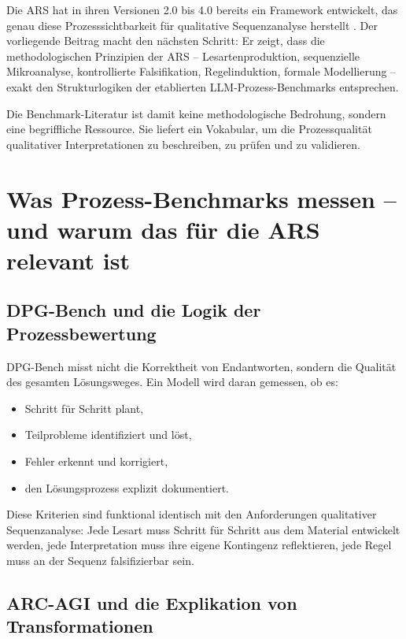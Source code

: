 \documentclass[12pt,a4paper]{article}
\begin{document}
Die ARS hat in ihren Versionen 2.0 bis 4.0 bereits ein Framework entwickelt, das genau diese Prozesssichtbarkeit für qualitative Sequenzanalyse herstellt \cite{koop2024ars}. Der vorliegende Beitrag macht den nächsten Schritt: Er zeigt, dass die methodologischen Prinzipien der ARS – Lesartenproduktion, sequenzielle Mikroanalyse, kontrollierte Falsifikation, Regelinduktion, formale Modellierung – exakt den Strukturlogiken der etablierten LLM-Prozess-Benchmarks entsprechen.

Die Benchmark-Literatur ist damit keine methodologische Bedrohung, sondern eine begriffliche Ressource. Sie liefert ein Vokabular, um die Prozessqualität qualitativer Interpretationen zu beschreiben, zu prüfen und zu validieren.

\section{Was Prozess-Benchmarks messen – und warum das für die ARS relevant ist}

\subsection{DPG-Bench und die Logik der Prozessbewertung}

DPG-Bench \cite{zhong2024dpg} misst nicht die Korrektheit von Endantworten, sondern die Qualität des gesamten Lösungsweges. Ein Modell wird daran gemessen, ob es:

\begin{itemize}
    \item Schritt für Schritt plant,
    \item Teilprobleme identifiziert und löst,
    \item Fehler erkennt und korrigiert,
    \item den Lösungsprozess explizit dokumentiert.
\end{itemize}

Diese Kriterien sind funktional identisch mit den Anforderungen qualitativer Sequenzanalyse: Jede Lesart muss Schritt für Schritt aus dem Material entwickelt werden, jede Interpretation muss ihre eigene Kontingenz reflektieren, jede Regel muss an der Sequenz falsifizierbar sein.

\subsection{ARC-AGI und die Explikation von Transformationen}
\end{document}
